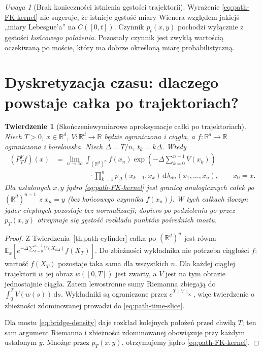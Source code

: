 \documentclass[11pt,a4paper,oneside]{report}
\numberwithin{equation}{chapter}
\theoremstyle{plain}
\newtheorem{twierdzenie}{Twierdzenie}[chapter]
\theoremstyle{definition}
\theoremstyle{remark}
\newtheorem{uwaga}{Uwaga}[chapter]
\newcommand{\R}{\mathbb{R}}
\newcommand{\E}{\mathbb{E}}
\newcommand{\dd}{\mathrm{d}}
\begin{document}
\begin{uwaga}[Brak konieczności istnienia gęstości trajektorii]
Wyrażenie \eqref{eq:path-FK-kernel} nie sugeruje, że
istnieje gęstość miary Wienera względem jakiejś
„miary Lebesgue'a” na $C([0,t])$. Czynnik $p_t(x,y)$
pochodzi wyłącznie z gęstości \emph{końcowego położenia}.
Pozostały czynnik jest zwykłą wartością oczekiwaną po
moście, który ma dobrze określoną miarę probabilistyczną.
\end{uwaga}

\section{Dyskretyzacja czasu: dlaczego powstaje całka po trajektoriach?}

\begin{twierdzenie}[Skończeniewymiarowe aproksymacje całki po trajektoriach]
\label{th:path-time-slice}
Niech $T>0$, $x\in\R^d$, $V:\R^d\to\R$ będzie
\emph{ograniczona i ciągła}, a $f:\R^d\to\R$
ograniczona i borelowska. Niech $\Delta=T/n$,
$t_k=k\Delta$. Wtedy
\[
\begin{split}
 (P_T^Vf)(x)&=\lim_{n\to\infty}
 \int_{(\R^d)^n}f(x_n)
 \exp\left(-\Delta\sum_{k=0}^{n-1}V(x_k)\right)\\
 &\hspace{2cm}\cdot\prod_{k=1}^n p_\Delta(x_{k-1},x_k)
 \,\dd\lambda_{dn}(x_1,\ldots,x_n),\qquad x_0=x.
\end{split}
\tag{15.10}\label{eq:path-time-slice}
\]
Dla ustalonych $x,y$ jądro \eqref{eq:path-FK-kernel}
jest granicą analogicznych całek po
$(\R^d)^{n-1}$ z $x_n=y$ (\emph{bez} końcowego
czynnika $f(x_n)$). W tych całkach iloczyn jąder
cieplnych pozostaje bez normalizacji; dopiero po
podzieleniu go przez $p_T(x,y)$ otrzymuje się gęstość
rozkładu punktów pośrednich mostu.
\end{twierdzenie}
\begin{proof}
Z Twierdzenia~\ref{th:path-cylinder} całka po
$(\R^d)^n$ jest równa
$\E_x[e^{-\Delta\sum_{k=0}^{n-1}V(X_{k\Delta})}f(X_T)]$.
Do zbieżności wykładnika nie potrzeba ciągłości $f$:
wartość $f(X_T)$ pozostaje taka sama dla wszystkich $n$.
Dla każdej ciągłej trajektorii $w$ jej obraz $w([0,T])$
jest zwarty, a $V$ jest na tym obrazie jednostajnie ciągła.
Zatem lewostronne sumy Riemanna zbiegają do
$\int_0^TV(w(s))\,\dd s$. Wykładniki są ograniczone
przez $e^{T\|V\|_\infty}$, więc twierdzenie o zbieżności
zdominowanej prowadzi do \eqref{eq:path-time-slice}.

Dla mostu \eqref{eq:bridge-density} daje rozkład
kolejnych położeń przed chwilą $T$; ten sam argument
Riemanna i zbieżności zdominowanej obowiązuje przy
każdym ustalonym $y$. Mnożąc przez $p_T(x,y)$,
otrzymujemy jądro \eqref{eq:path-FK-kernel}.
\end{proof}
\end{document}
